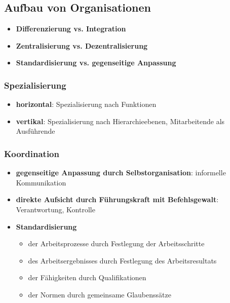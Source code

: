 \documentclass{article}
\begin{document}
\subsection{Aufbau von Organisationen}

\begin{itemize}
  \item \textbf{Differenzierung vs. Integration}
  \item \textbf{Zentralisierung vs. Dezentralisierung}
  \item \textbf{Standardisierung vs. gegenseitige Anpassung}
\end{itemize}

\subsubsection{Spezialisierung}
\begin{itemize}
  \item \textbf{horizontal}: Spezialisierung nach Funktionen
  \item \textbf{vertikal}: Spezialisierung nach Hierarchieebenen, Mitarbeitende als Ausführende
\end{itemize}

\subsubsection{Koordination}
\begin{itemize}
  \item \textbf{gegenseitige Anpassung durch Selbstorganisation}: informelle Kommunikation
  \item \textbf{direkte Aufsicht durch Führungskraft mit Befehlsgewalt}: Verantwortung, Kontrolle
  \item \textbf{Standardisierung}
        \begin{itemize}
          \item der Arbeitsprozesse durch Festlegung der Arbeitsschritte
          \item des Arbeitsergebnisses durch Festlegung des Arbeitsresultats
          \item der Fähigkeiten durch Qualifikationen
          \item der Normen durch gemeinsame Glaubenssätze
        \end{itemize}
\end{itemize}
\end{document}
